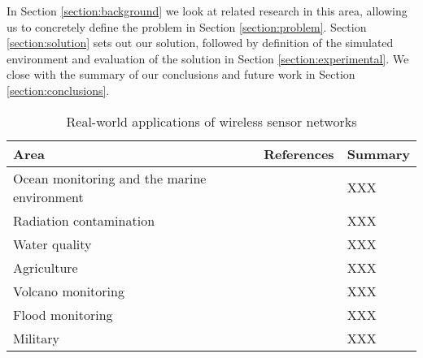 In Section \ref{section:background} we look at related research in this area, allowing us to concretely define the problem in Section \ref{section:problem}. Section \ref{section:solution} sets out our solution, followed by definition of the simulated environment and evaluation of the solution in Section \ref{section:experimental}. We close with the summary of our conclusions and future work in Section \ref{section:conclusions}.


\begin{table}
	\footnotesize
	\begin{tabular}{|p{}|p{}|p{}|}
		\hline
		Area & References & Summary \\
		\hline
		Ocean monitoring and the marine environment & \cite{Mahdy2008a, Albaladejo2010, 6973877} & XXX \\
		Radiation contamination & \cite{Gomez2015} & XXX \\
		Water quality & \cite{Fang2010} & XXX \\
		Agriculture  & \cite{8745854} & XXX \\
		Volcano monitoring  & \cite{Werner-Allen2006} & XXX \\
		Flood monitoring  & \cite{Castillo-effen2004} & XXX \\
		Military & \cite{6268958} & XXX \\
		\hline
	\end{tabular}
	\caption{Real-world applications of wireless sensor networks}
	\label{table:applications}	
\end{table}
